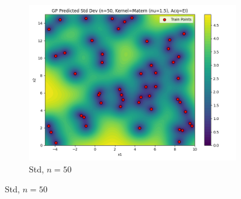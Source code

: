 \documentclass[a4paper,12pt]{article}
\begin{document}
\begin{figure}[H]
\begin{subfigure}{0.3\textwidth}
    \includegraphics[width=\linewidth]{Task-02/images/gp_std_matern_n50_EI.png}
    \caption{Std, $n=50$}
\end{subfigure}


\end{figure}
\end{document}
